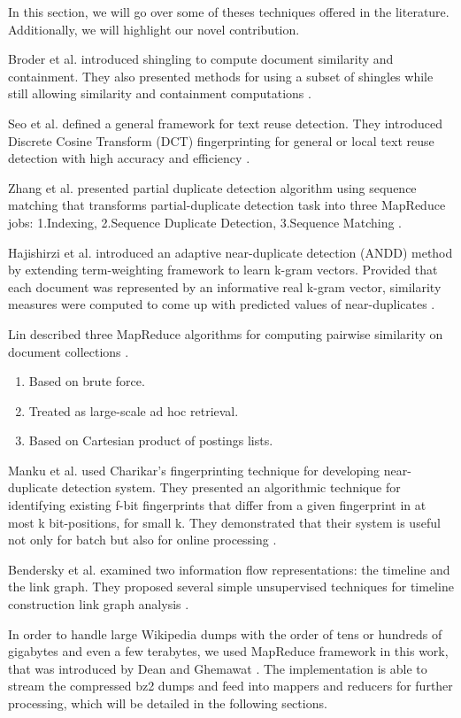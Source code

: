 \documentclass{acm_proc_article-sp}
\begin{document}
In this section, we will go over some of theses techniques offered in the literature. Additionally, we will highlight our novel contribution.

Broder et al. introduced shingling to compute document similarity and containment. They also presented methods for using a subset of shingles while still allowing similarity and containment computations \cite{broder:resemblance}.

Seo et al. defined a general framework for text reuse detection. They introduced Discrete Cosine Transform (DCT) fingerprinting for general or local text reuse detection with high accuracy and efficiency \cite{seo:dct}.

Zhang et al. presented partial duplicate detection algorithm using sequence matching that transforms partial-duplicate detection task into three MapReduce jobs: 1.Indexing, 2.Sequence Duplicate Detection, 3.Sequence Matching \cite{zhang:pdc}.

Hajishirzi et al. introduced an adaptive near-duplicate detection (ANDD) method by extending term-weighting framework to learn k-gram vectors. Provided that each document was represented by an informative real k-gram vector, similarity measures were computed to come up with predicted values of near-duplicates \cite{hajishirzi:andd}.

Lin described three MapReduce algorithms for computing pairwise similarity on document collections \cite{lin:brute}.
\begin{enumerate}
\item Based on brute force.
\item Treated as large-scale ad hoc retrieval.
\item Based on Cartesian product of postings lists.
\end{enumerate}

Manku et al. used Charikar's fingerprinting technique for developing near-duplicate detection system. They presented an algorithmic technique for identifying existing f-bit fingerprints that differ from a given fingerprint in at most k bit-positions, for small k. They demonstrated that their system is useful not only for batch but also for online processing \cite{manku:web}.

Bendersky et al. examined two information flow representations: the timeline and the link graph. They proposed several simple unsupervised techniques for timeline construction link graph analysis \cite{bendersky:timeline}.

In order to handle large Wikipedia dumps with the order of tens or hundreds of gigabytes and even a few terabytes, we used MapReduce framework in this work, that was introduced by Dean and Ghemawat \cite{dean:mapreduce}. The implementation is able to stream the compressed bz2 dumps and feed into mappers and reducers for further processing, which will be detailed in the following sections.
\end{document}
